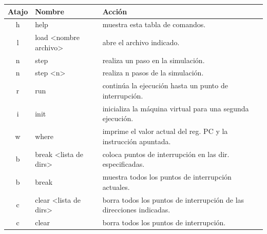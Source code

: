 \documentclass[12pt]{article}
\begin{document}
\begin{table}[H]
\hskip-2.0cm
\begin{tabular}{@{}cll@{}}
\toprule
\multicolumn{1}{c}{Atajo} & Nombre                                                       & Acción                                                                        \\ \midrule
h                         & help                                                         & muestra esta tabla de comandos.                                               \\
l                         & load \textless nombre archivo\textgreater                  & abre el archivo indicado.                                                     \\
n                         & step                                                         & realiza un paso en la simulación.                                             \\
n                         & step \textless n\textgreater                                  & realiza n pasos de la simulación.                                             \\
r                         & run                                                          & continúa la ejecución hasta un punto de interrupción.                         \\
i                         & init                                                         & inicializa la máquina virtual para una segunda ejecución.                     \\
w                         & where                                                        & imprime el valor actual del reg. PC y la instrucción apuntada.    \\
b                         & break \textless lista de dirs\textgreater              & coloca puntos de interrupción en las dir. especificadas.               \\
b                         & break                                                        & muestra todos los puntos de interrupción actuales.                            \\
c                         & clear \textless lista de dirs\textgreater              & borra todos los puntos de interrupción de las direcciones indicadas.          \\
c                         & clear                                                        & borra todos los puntos de interrupción.                                       \\

\end{tabular}
\end{table}
\end{document}
